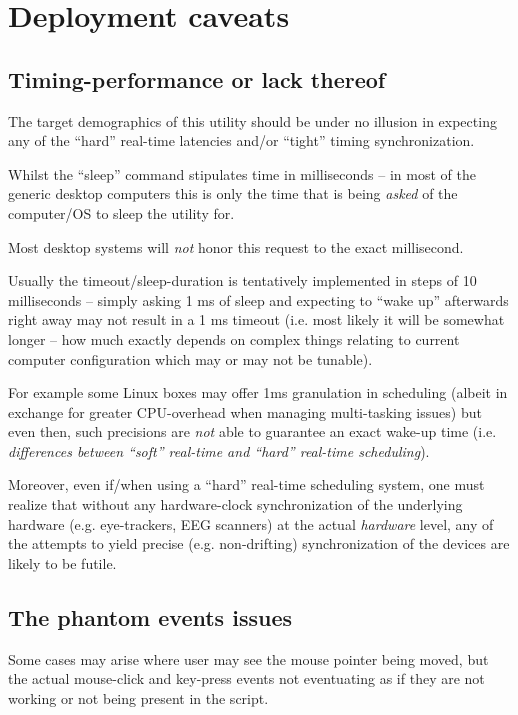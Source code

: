 \documentclass[12pt,a4paper]{article}
\begin{document}
\section{Deployment caveats}

\subsection{Timing-performance or lack thereof}
The target demographics of this utility should be under no illusion in expecting any of the ``hard'' real-time latencies and/or ``tight'' timing synchronization.

Whilst the ``sleep'' command stipulates time in milliseconds -- in most of the generic desktop computers this is only the time that is being \textit{asked} of the computer/OS to sleep the utility for.

Most desktop systems will \textit{not} honor this request to the exact millisecond. 

Usually the timeout/sleep-duration is tentatively implemented in steps of 10 milliseconds -- simply asking 1 ms of sleep and expecting to ``wake up'' afterwards right away may not result in a 1 ms timeout (i.e. most likely it will be somewhat longer -- how much exactly depends on complex things relating to current computer configuration which may or may not be tunable). 

For example some Linux boxes may offer 1ms granulation in scheduling (albeit in exchange for greater CPU-overhead when managing multi-tasking issues) but even then, such precisions are \textit{not} able to guarantee an exact wake-up time (i.e. \textit{differences between ``soft'' real-time and ``hard'' real-time scheduling}).

Moreover, even if/when using a ``hard'' real-time scheduling system, one must realize that without any hardware-clock synchronization of the underlying hardware (e.g. eye-trackers, EEG scanners) at the actual \textit{hardware} level, any of the attempts to yield precise (e.g. non-drifting) synchronization of the devices are likely to be futile.

\subsection{The phantom events issues}

Some cases may arise where user may see the mouse pointer being moved, but the actual mouse-click and key-press events not eventuating as if they are not working or not being present in the script.
\end{document}

